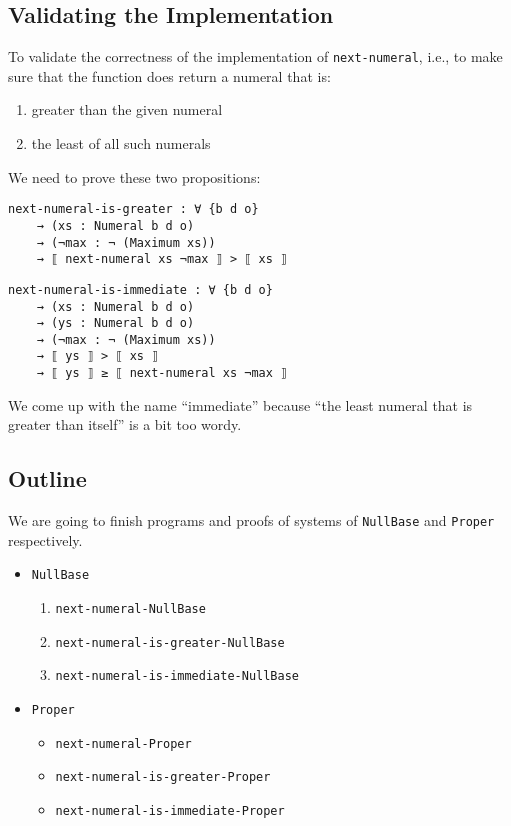 \documentclass[\main/thesis.tex]{subfiles}
\begin{document}
\subsection{Validating the Implementation}

To validate the correctness of the implementation of {\lstinline|next-numeral|},
i.e., to make sure that the function does return a numeral that is:

\begin{enumerate}
    \item greater than the given numeral
    \item the least of all such numerals
\end{enumerate}

We need to prove these two propositions:

\begin{lstlisting}
next-numeral-is-greater : ∀ {b d o}
    → (xs : Numeral b d o)
    → (¬max : ¬ (Maximum xs))
    → ⟦ next-numeral xs ¬max ⟧ > ⟦ xs ⟧
\end{lstlisting}

\begin{lstlisting}
next-numeral-is-immediate : ∀ {b d o}
    → (xs : Numeral b d o)
    → (ys : Numeral b d o)
    → (¬max : ¬ (Maximum xs))
    → ⟦ ys ⟧ > ⟦ xs ⟧
    → ⟦ ys ⟧ ≥ ⟦ next-numeral xs ¬max ⟧
\end{lstlisting}

We come up with the name ``immediate''
because ``the least numeral that is greater than itself'' is a bit too wordy.

\subsection{Outline}

We are going to finish programs and proofs of systems of {\lstinline|NullBase|}
and {\lstinline|Proper|} respectively.

\begin{itemize}
    \item {\lstinline|NullBase|}
        \begin{enumerate}
            \item {\lstinline|next-numeral-NullBase|}
            \item {\lstinline|next-numeral-is-greater-NullBase|}
            \item {\lstinline|next-numeral-is-immediate-NullBase|}
        \end{enumerate}
    \item {\lstinline|Proper|}
        \begin{itemize}
            \item {\lstinline|next-numeral-Proper|}
            \item {\lstinline|next-numeral-is-greater-Proper|}
            \item {\lstinline|next-numeral-is-immediate-Proper|}
        \end{itemize}
\end{itemize}
\end{document}
